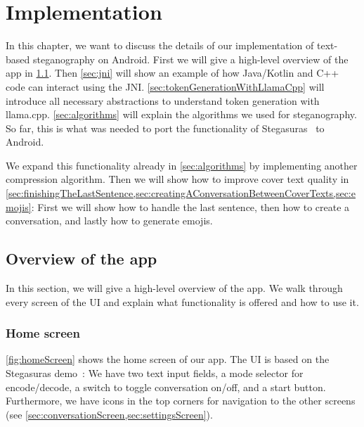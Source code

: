 
\chapter{Implementation}\label{ch:implementation}
\glsresetall %

In this chapter, we want to discuss the details of our implementation of text-based steganography on Android. First we will give a high-level overview of the app in \cref{sec:overviewOfTheApp}. Then \cref{sec:jni} will show an example of how Java/Kotlin and C++ code can interact using the \gls{JNI}. \cref{sec:tokenGenerationWithLlamaCpp} will introduce all necessary abstractions to understand token generation with llama.cpp. \cref{sec:algorithms} will explain the algorithms we used for steganography. So far, this is what was needed to port the functionality of Stegasuras~\cite{zieglerNeuralLinguisticSteganography2019} to Android.

We expand this functionality already in \cref{sec:algorithms} by implementing another compression algorithm. Then we will show how to improve cover text quality in \cref{sec:finishingTheLastSentence,sec:creatingAConversationBetweenCoverTexts,sec:emojis}: First we will show how to handle the last sentence, then how to create a conversation, and lastly how to generate emojis.

\section{Overview of the app}
\label{sec:overviewOfTheApp}
In this section, we will give a high-level overview of the app. We walk through every screen of the \gls{UI} and explain what functionality is offered and how to use it.

\subsection{Home screen}
\label{sec:homeScreen}
\cref{fig:homeScreen} shows the home screen of our app. The \gls{UI} is based on the Stegasuras demo~\cite{zieglerStegasuras2025}: We have two text input fields, a mode selector for encode/decode, a switch to toggle conversation on/off, and a start button. Furthermore, we have icons in the top corners for navigation to the other screens (see \cref{sec:conversationScreen,sec:settingsScreen}).

